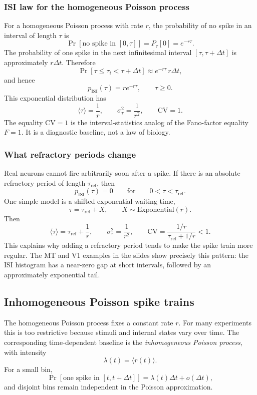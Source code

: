 \documentclass[11pt]{article}
\begin{document}
\subsubsection{ISI law for the homogeneous Poisson process}

For a homogeneous Poisson process with rate $r$, the probability of no spike in an interval of length $\tau$ is
\[
\Pr[\text{no spike in }[0,\tau]]=P_\tau[0]=e^{-r\tau}.
\]
The probability of one spike in the next infinitesimal interval $[\tau,\tau+\Delta t]$ is approximately $r\Delta t$. Therefore
\[
\Pr[\tau\le \tau_i<\tau+\Delta t]
\approx e^{-r\tau}\,r\Delta t,
\]
and hence
\[
p_{\mathrm{ISI}}(\tau)=r e^{-r\tau}, \qquad \tau\ge 0.
\]
This exponential distribution has
\[
\langle \tau\rangle=\frac{1}{r},
\qquad
\sigma_\tau^2=\frac{1}{r^2},
\qquad
\mathrm{CV}=1.
\]
The equality $\mathrm{CV}=1$ is the interval-statistics analog of the Fano-factor equality $F=1$. It is a diagnostic baseline, not a law of biology.

\subsubsection{What refractory periods change}

Real neurons cannot fire arbitrarily soon after a spike. If there is an absolute refractory period of length $\tau_{\mathrm{ref}}$, then
\[
p_{\mathrm{ISI}}(\tau)=0
\qquad\text{for}\qquad
0<\tau<\tau_{\mathrm{ref}}.
\]
One simple model is a shifted exponential waiting time,
\[
\tau=\tau_{\mathrm{ref}}+X,
\qquad
X\sim \mathrm{Exponential}(r).
\]
Then
\[
\langle \tau\rangle=\tau_{\mathrm{ref}}+\frac{1}{r},
\qquad
\sigma_\tau^2=\frac{1}{r^2},
\qquad
\mathrm{CV}=\frac{1/r}{\tau_{\mathrm{ref}}+1/r}<1.
\]
This explains why adding a refractory period tends to make the spike train more regular. The MT and V1 examples in the slides show precisely this pattern: the ISI histogram has a near-zero gap at short intervals, followed by an approximately exponential tail.

\subsection{Inhomogeneous Poisson spike trains}

The homogeneous Poisson process fixes a constant rate $r$. For many experiments this is too restrictive because stimuli and internal states vary over time. The corresponding time-dependent baseline is the \emph{inhomogeneous Poisson process}, with intensity
\[
\lambda(t)=\langle r(t)\rangle.
\]
For a small bin,
\[
\Pr[\text{one spike in }[t,t+\Delta t]]
=\lambda(t)\Delta t + o(\Delta t),
\]
and disjoint bins remain independent in the Poisson approximation.
\end{document}
